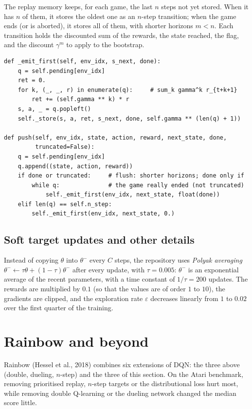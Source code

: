 The replay memory keeps, for each game, the last $n$ steps not yet
stored. When it has $n$ of them, it stores the oldest one as an $n$-step
transition; when the game ends (or is aborted), it stores all of them,
with shorter horizons $m < n$. Each transition holds the discounted sum
of the rewards, the state reached, the  flag, and the discount
$\gamma^m$ to apply to the bootstrap.
\begin{lstlisting}[caption={Assembling $n$-step transitions
  (\code{memories.py}, \code{NStepReplayBuffer})}]
def _emit_first(self, env_idx, s_next, done):
    q = self.pending[env_idx]
    ret = 0.
    for k, (_, _, r) in enumerate(q):     # sum_k gamma^k r_{t+k+1}
        ret += (self.gamma ** k) * r
    s, a, _ = q.popleft()
    self._store(s, a, ret, s_next, done, self.gamma ** (len(q) + 1))

def push(self, env_idx, state, action, reward, next_state, done,
         truncated=False):
    q = self.pending[env_idx]
    q.append((state, action, reward))
    if done or truncated:     # flush: shorter horizons; done only if
        while q:              # the game really ended (not truncated)
            self._emit_first(env_idx, next_state, float(done))
    elif len(q) == self.n_step:
        self._emit_first(env_idx, next_state, 0.)
\end{lstlisting}

\subsection{Soft target updates and other details}

Instead of copying $\theta$ into $\theta^-$ every $C$ steps, the repository
uses \emph{Polyak averaging} $\theta^- \gets \tau \theta + (1 - \tau)
\theta^-$ after every update, with $\tau = 0.005$: $\theta^-$ is an
exponential average of the recent parameters, with a time constant of
$1 / \tau = 200$ updates. The rewards are multiplied by $0.1$ (so that the
values are of order $1$ to $10$), the gradients are clipped, and the
exploration rate $\varepsilon$ decreases linearly from $1$ to $0.02$ over
the first quarter of the training.

\section{Rainbow and beyond}
\label{sec:rainbow}

Rainbow (Hessel et al., 2018) combines six extensions of DQN: the three
above (double, dueling, $n$-step) and the three of this section. On the
Atari benchmark, removing prioritised replay, $n$-step targets or the
distributional loss hurt most, while removing double Q-learning or the
dueling network changed the median score little.

